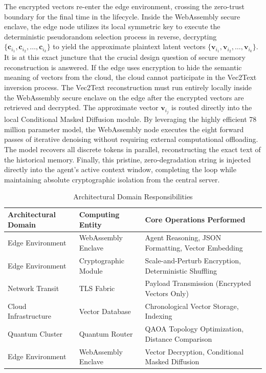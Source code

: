 \documentclass[12pt]{article}
\begin{document}
The encrypted vectors re-enter the edge environment, crossing the zero-trust boundary for the final time in the lifecycle. Inside the WebAssembly secure enclave, the edge node utilizes its local symmetric key to execute the deterministic pseudorandom selection process in reverse, decrypting $\{\mathbf{c}_{i_1}, \mathbf{c}_{i_2}, \ldots, \mathbf{c}_{i_k}\}$ to yield the approximate plaintext latent vectors $\{\mathbf{v}_{i_1}, \mathbf{v}_{i_2}, \ldots, \mathbf{v}_{i_k}\}$. It is at this exact juncture that the crucial design question of secure memory reconstruction is answered. If the edge uses encryption to hide the semantic meaning of vectors from the cloud, the cloud cannot participate in the Vec2Text inversion process. The Vec2Text reconstruction must run entirely locally inside the WebAssembly secure enclave on the edge after the encrypted vectors are retrieved and decrypted. The approximate vector $\mathbf{v}_{i_j}$ is routed directly into the local Conditional Masked Diffusion module. By leveraging the highly efficient 78 million parameter model, the WebAssembly node executes the eight forward passes of iterative denoising without requiring external computational offloading. The model recovers all discrete tokens in parallel, reconstructing the exact text of the historical memory. Finally, this pristine, zero-degradation string is injected directly into the agent's active context window, completing the loop while maintaining absolute cryptographic isolation from the central server.

\begin{table}[h]
\centering
\begin{tabular}{|l|l|l|}
\hline
\textbf{Architectural Domain} & \textbf{Computing Entity} & \textbf{Core Operations Performed} \\
\hline
Edge Environment & WebAssembly Enclave & Agent Reasoning, JSON Formatting, Vector Embedding \\
Edge Environment & Cryptographic Module & Scale-and-Perturb Encryption, Deterministic Shuffling \\
Network Transit & TLS Fabric & Payload Transmission (Encrypted Vectors Only) \\
Cloud Infrastructure & Vector Database & Chronological Vector Storage, Indexing \\
Quantum Cluster & Quantum Router & QAOA Topology Optimization, Distance Comparison \\
Edge Environment & WebAssembly Enclave & Vector Decryption, Conditional Masked Diffusion \\
\hline
\end{tabular}
\caption{Architectural Domain Responsibilities}
\end{table}
\end{document}
